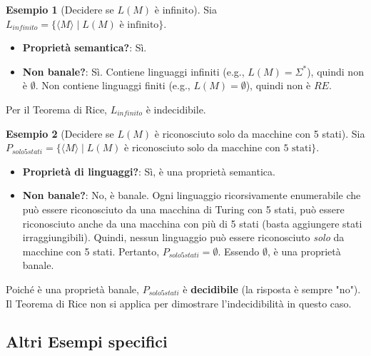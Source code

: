 \documentclass[a4paper]{article}
\theoremstyle{definition} %
\newtheorem{example}{Esempio}
\begin{document}
\begin{example}[Decidere se $L(M)$ è infinito]
Sia $L_{infinito} = \{\langle M \rangle \mid L(M) \text{ è infinito}\}$.
\begin{itemize}
    \item \textbf{Proprietà semantica?}: Sì.
    \item \textbf{Non banale?}: Sì. Contiene linguaggi infiniti (e.g., $L(M)=\Sigma^*$), quindi non è $\emptyset$. Non contiene linguaggi finiti (e.g., $L(M)=\emptyset$), quindi non è $RE$.
\end{itemize}
Per il Teorema di Rice, $L_{infinito}$ è indecidibile.
\end{example}

\begin{example}[Decidere se $L(M)$ è riconosciuto solo da macchine con 5 stati]
Sia $P_{solo5stati} = \{\langle M \rangle \mid L(M) \text{ è riconosciuto solo da macchine con 5 stati}\}$.
\begin{itemize}
    \item \textbf{Proprietà di linguaggi?}: Sì, è una proprietà semantica.
    \item \textbf{Non banale?}: No, è banale. Ogni linguaggio ricorsivamente enumerabile che può essere riconosciuto da una macchina di Turing con 5 stati, può essere riconosciuto anche da una macchina con più di 5 stati (basta aggiungere stati irraggiungibili). Quindi, nessun linguaggio può essere riconosciuto \emph{solo} da macchine con 5 stati. Pertanto, $P_{solo5stati} = \emptyset$. Essendo $\emptyset$, è una proprietà banale.
\end{itemize}
Poiché è una proprietà banale, $P_{solo5stati}$ è \textbf{decidibile} (la risposta è sempre "no"). Il Teorema di Rice non si applica per dimostrare l'indecidibilità in questo caso.
\end{example}

\subsection{Altri Esempi specifici}
\end{document}
